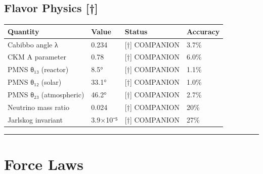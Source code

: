 \documentclass[
  11pt,
  letterpaper,
  twoside,
  openany]{book}
\makeatletter
\let\orig@section\section
\renewcommand{\section}{\needspace{8\baselineskip}\orig@section}
\let\orig@subsection\subsection
\renewcommand{\subsection}{\needspace{6\baselineskip}\orig@subsection}
\makeatother
\begin{document}
\subsection{Flavor Physics {[}†{]}}\label{flavor-physics}

\begin{longtable}[]{@{}llll@{}}
\toprule\noalign{}
Quantity & Value & Status & Accuracy \\
\midrule\noalign{}
\endhead
\bottomrule\noalign{}
\endlastfoot
Cabibbo angle λ & 0.234 & {[}†{]} COMPANION & 3.7\% \\
CKM A parameter & 0.78 & {[}†{]} COMPANION & 6.0\% \\
PMNS θ₁₃ (reactor) & 8.5° & {[}†{]} COMPANION & 1.1\% \\
PMNS θ₁₂ (solar) & 33.1° & {[}†{]} COMPANION & 1.0\% \\
PMNS θ₂₃ (atmospheric) & 46.2° & {[}†{]} COMPANION & 2.7\% \\
Neutrino mass ratio & 0.024 & {[}†{]} COMPANION & 20\% \\
Jarlskog invariant & 3.9×10⁻⁵ & {[}†{]} COMPANION & 27\% \\
\end{longtable}

\begin{center}\rule{0.5\linewidth}{0.5pt}\end{center}

\section{Force Laws}\label{force-laws}
\end{document}

